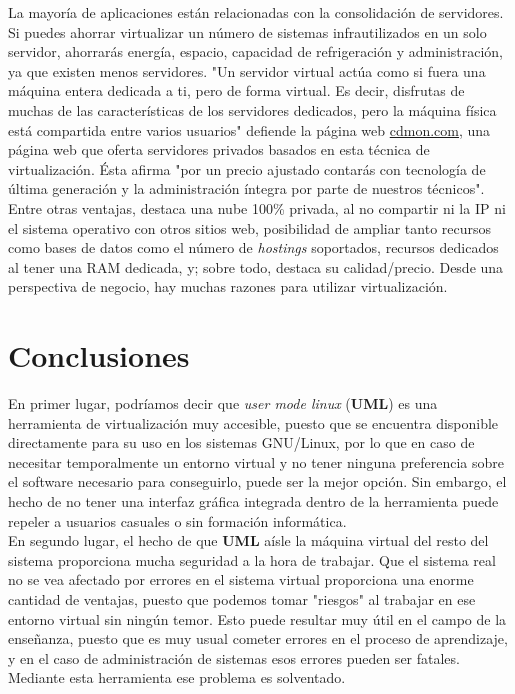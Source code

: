 \documentclass[11pt,twoside,titlepage,a4paper]{article}
\theoremstyle{definition}
\theoremstyle{plain_rojo}
\theoremstyle{remark}
\begin{document}
La mayoría de aplicaciones están relacionadas con la consolidación de 
servidores. Si puedes ahorrar virtualizar un número de sistemas 
infrautilizados en un solo servidor, ahorrarás energía, espacio, capacidad de 
refrigeración y administración, ya que existen menos servidores. "Un servidor 
virtual actúa como si fuera una máquina entera dedicada a ti, pero de forma 
virtual. Es decir, disfrutas de muchas de las características de los 
servidores dedicados, pero la máquina física está compartida entre varios 
usuarios" defiende la página web \url{cdmon.com}, una página web que oferta 
servidores privados basados en esta técnica de virtualización. Ésta afirma 
"por un precio ajustado contarás con tecnología de última generación y la 
administración íntegra por parte de nuestros técnicos". Entre otras ventajas, 
destaca una nube 100\% privada, al no compartir ni la IP ni el sistema 
operativo con otros sitios web, posibilidad de ampliar tanto recursos como 
bases de datos como el número de \textit{hostings} soportados, recursos 
dedicados al tener una RAM dedicada, y; sobre todo, destaca su 
calidad/precio. Desde una perspectiva de negocio, hay muchas razones para
utilizar virtualización.

\section{Conclusiones}

En primer lugar, podríamos decir que \textit{user mode linux} (\textbf{UML}) 
es una herramienta de virtualización muy accesible, puesto que se encuentra 
disponible directamente para su uso en los sistemas GNU/Linux, por lo que en
caso de necesitar temporalmente un entorno virtual y no tener ninguna
preferencia sobre el software necesario para conseguirlo, puede ser la mejor
opción. Sin embargo, el hecho de no tener una interfaz gráfica integrada
dentro de la herramienta puede repeler a usuarios casuales o sin formación
informática. 
\\

En segundo lugar, el hecho de que \textbf{UML} aísle la máquina virtual del
resto del sistema proporciona mucha seguridad a la hora de trabajar. Que el
sistema real no se vea afectado por errores en el sistema virtual proporciona
una enorme cantidad de ventajas, puesto que podemos tomar "riesgos" al 
trabajar en ese entorno virtual sin ningún temor. Esto puede resultar muy
útil en el campo de la enseñanza, puesto que es muy usual cometer errores
en el proceso de aprendizaje, y en el caso de administración de sistemas esos
errores pueden ser fatales. Mediante esta herramienta ese problema es
solventado.
\\
\end{document}
